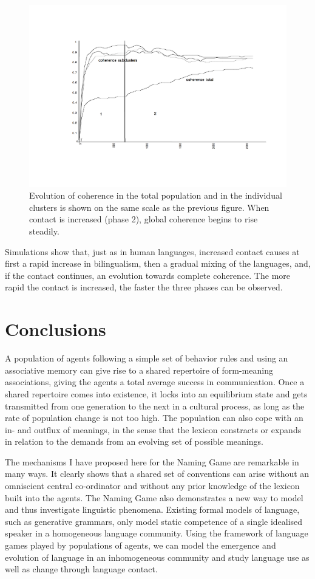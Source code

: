 \begin{figure}[htbp]
  \centerline{\includegraphics[width=.80\textwidth]{chap5/figs/coherence}}
\caption{Evolution of coherence in the total population 
and in the individual clusters is shown on the same
scale as the previous figure. When contact 
is increased (phase 2), global coherence begins to rise steadily.}
\label{figure-coherence-in-space}
\end{figure}
Simulations show that, just as in human languages,
increased contact causes at first a rapid increase in
bilingualism, then a gradual mixing of the languages, and, 
if the contact
continues, an evolution towards complete coherence. 
The more rapid the contact is
increased, the faster the three phases can be observed. 

\section{Conclusions}

A population of agents following a simple set of 
behavior rules and using an associative memory
can give rise to a shared repertoire of form-meaning 
associations, giving the agents a total average success in 
communication. Once a shared repertoire comes
into existence, it locks into an equilibrium state and 
gets transmitted from one generation to the next in a 
cultural process, as long as the rate of population change 
is not too high. The population can also cope with 
an in- and outflux of meanings, in the sense that 
the lexicon constracts or expands in relation to the 
demands from an evolving set of possible meanings.  

The mechanisms I have proposed here for the Naming Game are
remarkable in many ways. It clearly shows that a
shared set of conventions
can arise without an omniscient central co-ordinator and
without any prior knowledge of the lexicon built into 
the agents. The Naming Game also demonstrates
a new way to model and thus
investigate linguistic phenomena. Existing formal models
of language, such as generative grammars, only model static
competence of a single idealised speaker in a homogeneous language
community. Using the framework of language games 
played by populations of agents, we can model the 
emergence and evolution of language in an inhomogeneous community
and study language use as well as change 
through language contact. 

